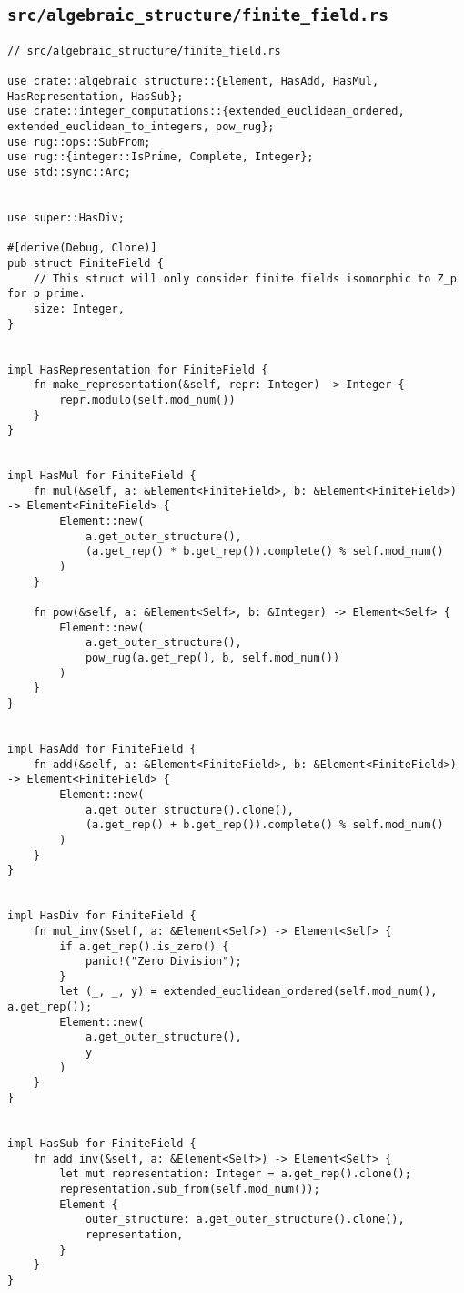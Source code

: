 \subsection{\lstinline{src/algebraic_structure/finite_field.rs}}

\begin{verbatim}
// src/algebraic_structure/finite_field.rs

use crate::algebraic_structure::{Element, HasAdd, HasMul, HasRepresentation, HasSub};
use crate::integer_computations::{extended_euclidean_ordered, extended_euclidean_to_integers, pow_rug};
use rug::ops::SubFrom;
use rug::{integer::IsPrime, Complete, Integer};
use std::sync::Arc;


use super::HasDiv;

#[derive(Debug, Clone)]
pub struct FiniteField {
    // This struct will only consider finite fields isomorphic to Z_p for p prime.
    size: Integer,
}


impl HasRepresentation for FiniteField {
    fn make_representation(&self, repr: Integer) -> Integer {
        repr.modulo(self.mod_num())
    }
}


impl HasMul for FiniteField {
    fn mul(&self, a: &Element<FiniteField>, b: &Element<FiniteField>) -> Element<FiniteField> {
        Element::new(
            a.get_outer_structure(),
            (a.get_rep() * b.get_rep()).complete() % self.mod_num()
        )
    }

    fn pow(&self, a: &Element<Self>, b: &Integer) -> Element<Self> {
        Element::new(
            a.get_outer_structure(),
            pow_rug(a.get_rep(), b, self.mod_num())
        )
    }
}


impl HasAdd for FiniteField {
    fn add(&self, a: &Element<FiniteField>, b: &Element<FiniteField>) -> Element<FiniteField> {
        Element::new(
            a.get_outer_structure().clone(),
            (a.get_rep() + b.get_rep()).complete() % self.mod_num()
        )
    }
}


impl HasDiv for FiniteField {
    fn mul_inv(&self, a: &Element<Self>) -> Element<Self> {
        if a.get_rep().is_zero() {
            panic!("Zero Division");
        }
        let (_, _, y) = extended_euclidean_ordered(self.mod_num(), a.get_rep());
        Element::new(
            a.get_outer_structure(),
            y
        )
    }
}


impl HasSub for FiniteField {
    fn add_inv(&self, a: &Element<Self>) -> Element<Self> {
        let mut representation: Integer = a.get_rep().clone();
        representation.sub_from(self.mod_num());
        Element {
            outer_structure: a.get_outer_structure().clone(),
            representation,
        }
    }
}



\end{verbatim}

